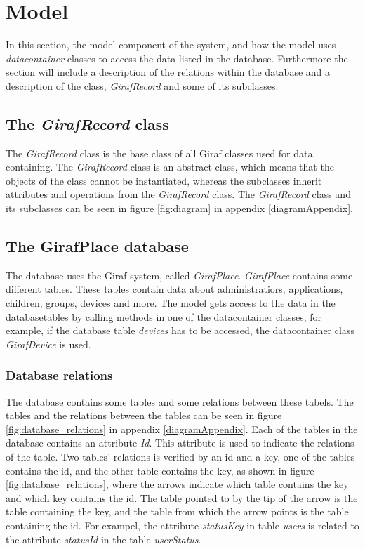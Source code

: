 \section{Model}
\label{model}

In this section, the model component of the system, and how the model uses \textit{datacontainer} classes to access the data listed in the database. Furthermore the section will include a description of the relations within the database and a description of the class, \textit{GirafRecord} and some of its subclasses.

\subsection{The \textit{GirafRecord} class}
The \textit{GirafRecord} class is the base class of all Giraf classes used for data containing. The \textit{GirafRecord} class is an abstract class, which means that the objects of the class cannot be instantiated, whereas the subclasses inherit attributes and operations from the \textit{GirafRecord} class. The \textit{GirafRecord} class and its subclasses can be seen in figure \ref{fig:diagram} in appendix \ref{diagramAppendix}.

\subsection{The GirafPlace database}
The database uses the Giraf system, called \textit{GirafPlace}. \textit{GirafPlace} contains some different tables. These tables contain data about administratiors, applications, children, groups, devices and more.
The model gets access to the data in the databasetables by calling methods in one of the datacontainer classes, for example, if the database table \textit{devices} has to be accessed, the datacontainer class \textit{GirafDevice} is used.

\subsubsection{Database relations}
The database contains some tables and some relations between these tabels. The tables and the relations between the tables can be seen in figure \ref{fig:database_relations} in appendix \ref{diagramAppendix}.
Each of the tables in the database contains an attribute \textit{Id}. This attribute is used to indicate the relations of the table. Two tables' relations is verified by an id and a key, one of the tables contains the id, and the other table contains the key, as shown in figure \ref{fig:database_relations}, where the arrows indicate which table contains the key and which key contains the id. The table pointed to by the tip of the arrow is the table containing the key, and the table from which the arrow points is the table containing the id. 
For exampel, the attribute  \textit{statusKey} in table \textit{users} is related to the attribute \textit{statusId} in the table \textit{userStatus}.